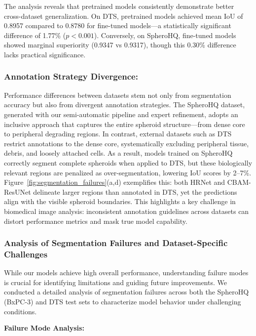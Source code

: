 \documentclass[preprint,12pt]{elsarticle}
\newcommand{\dsHQ}{SpheroHQ}
\newcommand{\dsDTS}{DTS}
\begin{document}
The analysis reveals that pretrained models consistently demonstrate better cross-dataset generalization. On \dsDTS{}, pretrained models achieved mean IoU of 0.8957 compared to 0.8780 for fine-tuned models—a statistically significant difference of 1.77\% ($p < 0.001$). Conversely, on \dsHQ{}, fine-tuned models showed marginal superiority (0.9347 vs 0.9317), though this 0.30\% difference lacks practical significance.

\subsubsection{Annotation Strategy Divergence:}
\label{subsub:AnnotationStrategyDivergence}
Performance differences between datasets stem not only from segmentation accuracy but also from divergent annotation strategies. The \dsHQ{} dataset, generated with our semi-automatic pipeline and expert refinement, adopts an inclusive approach that captures the entire spheroid structure—from dense core to peripheral degrading regions. In contrast, external datasets such as \dsDTS{} restrict annotations to the dense core, systematically excluding peripheral tissue, debris, and loosely attached cells. As a result, models trained on \dsHQ{} correctly segment complete spheroids when applied to \dsDTS{}, but these biologically relevant regions are penalized as over-segmentation, lowering IoU scores by 2–7\%. Figure~\ref{fig:segmentation_failures}(a,d) exemplifies this: both HRNet and CBAM-ResUNet delineate larger regions than annotated in \dsDTS{}, yet the predictions align with the visible spheroid boundaries. This highlights a key challenge in biomedical image analysis: inconsistent annotation guidelines across datasets can distort performance metrics and mask true model capability.

\subsubsection{Analysis of Segmentation Failures and Dataset-Specific Challenges}
\label{sec:failure_analysis}

While our models achieve high overall performance, understanding failure modes is crucial for identifying limitations and guiding future improvements. We conducted a detailed analysis of segmentation failures across both the \dsHQ{} (BxPC-3) and \dsDTS{} test sets to characterize model behavior under challenging conditions.

\textbf{Failure Mode Analysis:}\nopagebreak
\end{document}
